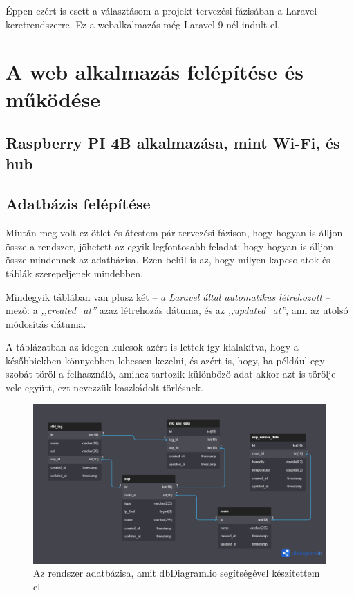 \documentclass[
]{thesis-ekf}
\theoremstyle{definition}
\theoremstyle{remark}
\begin{document}
	Éppen ezért is esett a választásom a projekt tervezési fázisában a Laravel keretrendszerre. Ez a webalkalmazás még Laravel 9-nél indult el.
	
	\chapter{A web alkalmazás felépítése és működése}
	\section{Raspberry PI 4B alkalmazása, mint Wi-Fi, és hub}
	\hulipsum[1-2]
	\section{Adatbázis felépítése}\label{database}
	
	Miután meg volt ez ötlet és átestem pár tervezési fázison, hogy hogyan is álljon össze a rendszer, jöhetett az egyik legfontosabb feladat: hogy hogyan is álljon össze mindennek az adatbázisa. Ezen belül is az, hogy milyen kapcsolatok és táblák szerepeljenek mindebben.
	
	Mindegyik táblában van plusz két -- \emph{a Laravel által automatikus létrehozott} -- mező: a \emph{,,created\_at''} azaz létrehozás dátuma, és az \emph{,,updated\_at''}, ami az utolsó módosítás dátuma.
	
	A táblázatban az idegen kulcsok azért is lettek így kialakítva, hogy a későbbiekben könnyebben lehessen kezelni, és azért is, hogy, ha például egy szobát töröl a felhasználó, amihez tartozik különböző adat akkor azt is törölje vele együtt, ezt nevezzük kaszkádolt törlésnek.
	\begin{figure}[ht!]
		\centering
		\includegraphics[width=1\textwidth]{./src/database}
		\caption{Az rendszer adatbázisa, amit dbDiagram.io segítségével készítettem el}
		\label{database-fig}
	\end{figure}	
\end{document}
